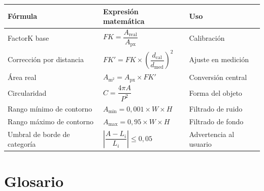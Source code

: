 \documentclass[12pt, a4paper]{article}
\begin{document}
\begin{center}
\renewcommand{\arraystretch}{2.2}
\begin{longtable}{p{4cm} p{5.5cm} p{4cm}}
\toprule
\textbf{Fórmula} & \textbf{Expresión matemática} & \textbf{Uso} \\
\midrule
FactorK base &
  $FK = \dfrac{A_{\text{real}}}{A_{\text{px}}}$ &
  Calibración \\
\midrule
Corrección por distancia &
  $FK' = FK \times \left(\dfrac{d_{\text{cal}}}{d_{\text{med}}}\right)^2$ &
  Ajuste en medición \\
\midrule
Área real &
  $A_{\text{m}^2} = A_{\text{px}} \times FK'$ &
  Conversión central \\
\midrule
Circularidad &
  $C = \dfrac{4\pi A}{P^2}$ &
  Forma del objeto \\
\midrule
Rango mínimo de contorno &
  $A_{\min} = 0{,}001 \times W \times H$ &
  Filtrado de ruido \\
\midrule
Rango máximo de contorno &
  $A_{\max} = 0{,}95 \times W \times H$ &
  Filtrado de fondo \\
\midrule
Umbral de borde de categoría &
  $\left|\dfrac{A - L_i}{L_i}\right| \leq 0{,}05$ &
  Advertencia al usuario \\
\bottomrule
\end{longtable}
\end{center}

\section{Glosario}
\end{document}

